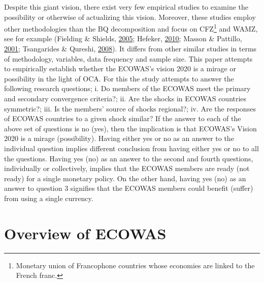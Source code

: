 \documentclass[]{article}
\let\rmarkdownfootnote\footnote%
\def\footnote{\protect\rmarkdownfootnote}
\begin{document}
Despite this giant vision, there exist very few empirical studies to examine the possibility or otherwise of actualizing this vision. Moreover, these studies employ other methodologies than the \ac{BQ} decomposition and focus on  \ac{CFZ}\footnote{Monetary union of Francophone countries whose economies are linked to the French franc.} and  \ac{WAMZ}, see for example (Fielding \& Shields, \protect\hyperlink{ref-Fielding2005}{2005}; Hefeker, \protect\hyperlink{ref-hefeker2010fiscal}{2010}; Masson \& Pattillo, \protect\hyperlink{ref-masson2001monetary}{2001}; Tsangarides \& Qureshi, \protect\hyperlink{ref-TSANGARIDES20081261}{2008}). It differs from other similar studies in terms of methodology, variables, data frequency and sample size. This paper attempts to empirically establish whether the \ac{ECOWAS}'s vision 2020 is a mirage or possibility in the light of OCA. For this the study attempts to answer the following research questions; i. Do members of the ECOWAS meet the primary and secondary convergence criteria?; ii. Are the shocks in ECOWAS countries symmetric?; iii. Is the members' source of shocks regional?; iv. Are the responses of ECOWAS countries to a given shock similar? If the answer to each of the above set of questions is no (yes), then the implication is that ECOWAS's Vision 2020 is a mirage (possibility). Having either yes or no as an answer to the individual question implies different conclusion from having either yes or no to all the questions. Having yes (no) as an answer to the second and fourth questions, individually or collectively, implies that the ECOWAS members are ready (not ready) for a single monetary policy. On the other hand, having yes (no) as an answer to question 3 signifies that the ECOWAS members could benefit (suffer) from using a single currency.

\hypertarget{overview-of-ecowas}{%
\section{Overview of ECOWAS}\label{overview-of-ecowas}}
\end{document}
